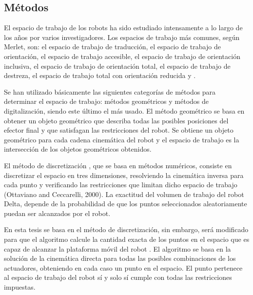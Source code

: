     \newpage
    
    \subsection{Métodos}
    
    El espacio de trabajo de los robots ha sido estudiado intensamente a lo largo de los años por varios investigadores. Los espacios de trabajo más comunes, según Merlet, son: el espacio de trabajo de traducción, el espacio de trabajo de orientación, el espacio de trabajo accesible, el espacio de trabajo de orientación inclusiva, el espacio de trabajo de orientación total, el espacio de trabajo de destreza, el espacio de trabajo total con orientación reducida \cite{Laribi08} y \cite{AFFI2004311}.
    
    Se han utilizado básicamente las siguientes categorías de métodos para determinar el espacio de trabajo: métodos geométricos y métodos de digitalización, siendo este último el más usado.
    El método geométrico \cite{delta_Urrea} se basa en obtener un objeto geométrico que describa todas las posibles posiciones del efector final y que satisfagan las restricciones del robot. Se obtiene un objeto geométrico para cada cadena cinemática del robot y el espacio de trabajo es la intersección de los objetos geométricos obtenidos.
    
    El método de discretización \cite{delta_Urrea}, que se basa en métodos numéricos, consiste en discretizar el espacio en tres dimensiones, resolviendo la cinemática inversa para cada punto y verificando las restricciones que limitan dicho espacio de trabajo (Ottaviano and Ceccarelli, 2000). La exactitud del volumen de trabajo del robot Delta, depende de la probabilidad de que los puntos seleccionados aleatoriamente puedan ser alcanzados por el robot. 
    
    En esta tesis se basa en el método de discretización, sin embargo, será modificado para que el algoritmo calcule la cantidad exacta de los puntos en el espacio que es capaz de alcanzar la plataforma móvil del robot \cite{delta_Urrea}. El algoritmo se basa en la solución de la cinemática directa para todas las posibles combinaciones de los actuadores, obteniendo en cada caso un punto en el espacio. El punto pertenece al espacio de trabajo del robot sí y solo sí cumple con todas las restricciones impuestas.
    
